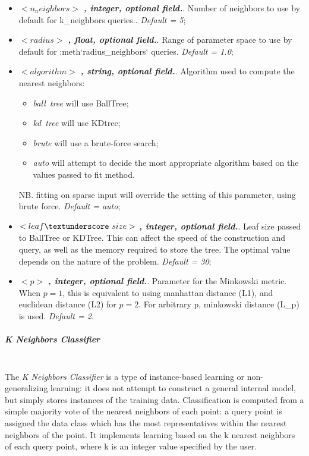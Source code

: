 \begin{itemize}
\item $<n_neighbors>$ \textbf{\textit{, integer, optional field.}}.  Number of neighbors to use by default for k\_neighbors queries.. \textit{Default = 5};
\item $<radius>$ \textbf{\textit{, float, optional field.}}.  Range of parameter space to use by default for :meth`radius\_neighbors` queries. \textit{Default = 1.0};
\item $<algorithm>$ \textbf{\textit{, string, optional field.}}.  Algorithm used to compute the nearest neighbors:
\begin{itemize}
\item \textit{ball\textunderscore~tree} will use BallTree;
\item \textit{kd\textunderscore~tree} will use KDtree;
\item \textit{brute} will use a brute-force search;
\item \textit{auto} will attempt to decide the most appropriate algorithm based on the values passed to fit method.
\end{itemize}
NB. fitting on sparse input will override the setting of this parameter, using brute force. \textit{Default = auto};
\item $<leaf\textunderscore~size>$ \textbf{\textit{, integer, optional field.}}.  Leaf size passed to BallTree or KDTree. This can affect the speed of the construction and query, as well as the memory required to store the tree. The optimal value depends on the nature of the problem. \textit{Default = 30};
\item $<p>$ \textbf{\textit{, integer, optional field.}}.  Parameter for the Minkowski metric. When $p = 1$, this is equivalent to using manhattan distance (L1), and euclidean distance (L2) for $p = 2$. For arbitrary p, minkowski distance (L\_p) is used. \textit{Default = 2}.
\end{itemize}
\subparagraph{K Neighbors Classifier }
\mbox{}
\\The \textit{K Neighbors Classifier} is a type of instance-based learning or non-generalizing learning: it does not attempt to construct a general internal model, but simply stores instances of the training data. Classification is computed from a simple majority vote of the nearest neighbors of each point: a query point is assigned the data class which has the most representatives within the nearest neighbors of the point. It implements learning based on the k nearest neighbors of each query point, where k is an integer value specified by the user.
